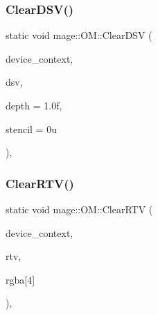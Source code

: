 \hypertarget{structmage_1_1_o_m_ac0f3608a96a3e9b1e5227c40ef01951d}{}\label{structmage_1_1_o_m_ac0f3608a96a3e9b1e5227c40ef01951d} 
\subsubsection{\texorpdfstring{Clear\+D\+S\+V()}{ClearDSV()}}
{\footnotesize\ttfamily static void mage\+::\+O\+M\+::\+Clear\+D\+SV (\begin{DoxyParamCaption}\item[{I\+D3\+D11\+Device\+Context2 $\ast$}]{device\+\_\+context,  }\item[{I\+D3\+D11\+Depth\+Stencil\+View $\ast$}]{dsv,  }\item[{F\+L\+O\+AT}]{depth = {\ttfamily 1.0f},  }\item[{U\+I\+N\+T8}]{stencil = {\ttfamily 0u} }\end{DoxyParamCaption})\hspace{0.3cm}{\ttfamily [static]}, {\ttfamily [noexcept]}}

\hypertarget{structmage_1_1_o_m_a96d478f50d4c1be5336332cfbd2f3be8}{}\label{structmage_1_1_o_m_a96d478f50d4c1be5336332cfbd2f3be8} 
\subsubsection{\texorpdfstring{Clear\+R\+T\+V()}{ClearRTV()}}
{\footnotesize\ttfamily static void mage\+::\+O\+M\+::\+Clear\+R\+TV (\begin{DoxyParamCaption}\item[{I\+D3\+D11\+Device\+Context2 $\ast$}]{device\+\_\+context,  }\item[{I\+D3\+D11\+Render\+Target\+View $\ast$}]{rtv,  }\item[{const F\+L\+O\+AT}]{rgba\mbox{[}4\mbox{]} }\end{DoxyParamCaption})\hspace{0.3cm}{\ttfamily [static]}, {\ttfamily [noexcept]}}

\hypertarget{structmage_1_1_o_m_ab80bb9331f0761ca5381498c750bddc5}{}\label{structmage_1_1_o_m_ab80bb9331f0761ca5381498c750bddc5} 
